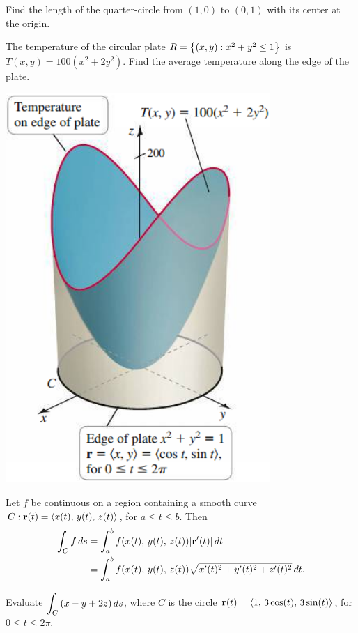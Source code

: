 \documentclass[mathNotesPreamble]{subfiles}
\begin{document}
  \begin{ex*}
    Find the length of the quarter-circle from $(1,0)$ to $(0,1)$ with its center at the origin.
  \end{ex*}
  \pagebreak

  \begin{ex*}
    The temperature of the circular plate $R={\left\{(x,y): x^2+y^2\leq 1\right\}}$ is $T(x,y)=100(x^2+2y^2)$. Find the average temperature along the edge of the plate.
  \end{ex*}
  \begin{flushright}
    \includegraphics[width=0.35\linewidth]{images/briggs_17_02/fig17_18}
  \end{flushright}
  \pagebreak


  \begin{thmBox*}
    Let $f$ be continuous on a region containing a smooth curve $C: {\mathbf{r}}(t)={\left\langle x(t),\,y(t),\,z(t) \right\rangle}$, for $a\leq t\leq b$. Then
    \begin{align*}
      \int_C f\,ds&= \int_a^b f{\left(x(t),\,y(t),\,z(t)\right)}{\left\vert{\mathbf{r}}'(t)\right\vert}\,dt\\
        &= \int_a^b  f{\left(x(t),\,y(t),\,z(t)\right)}\sqrt{x'(t)^2+y'(t)^2+z'(t)^2}\,dt.
    \end{align*}
  \end{thmBox*}

  \begin{ex*}
    Evaluate $\displaystyle \int_C {\left(x-y+2z\right)}\,ds$, where $C$ is the circle ${\mathbf{r}}(t)={\left\langle 1,\,3\cos(t),\,3\sin(t) \right\rangle}$, for $0\leq t\leq 2\pi$.
  \end{ex*}
  \pagebreak
\end{document}

